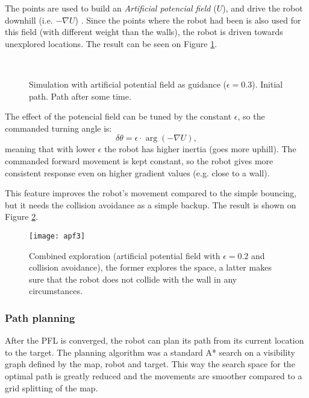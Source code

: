 		The points are used to build an \textit{Artificial potencial field} ($U$), and drive the robot downhill (i.e. $-\nabla U$) \parencite{choset_principles_2005}. Since the points where the robot had been is also used for this field (with different weight than the walls), the robot is driven towards unexplored locations. The result can be seen on Figure \ref{fig:apf}.
		
		\begin{figure}[h]
		    \centering
		    ~
		     
		    \caption{Simulation with artificial potential field as guidance ($\epsilon=0.3$). \protect{} Initial path. \protect{} Path after some time.}
		    \label{fig:apf}
	 	\end{figure}
	 	
	 	The effect of the potencial field can be tuned by the constant $\epsilon$, so the commanded turning angle is:
	 	\begin{equation}
			\delta \theta=\epsilon\cdot\arg(-\nabla U),
	 	\end{equation}
	 	meaning that with lower $\epsilon$ the robot has higher inertia (goes more uphill). The commanded forward movement is kept constant, so the robot gives more consistent response even on higher gradient values (e.g. close to a wall).
	 	
	 	
	 	This feature improves the robot's movement compared to the simple bouncing, but it needs the collision avoidance as a simple backup. The result is shown on Figure \ref{fig:apf3}.

		
		\begin{figure}[h]
			\centering
			\texttt{[image: apf3]}
			
			\caption{Combined exploration (artificial potential field with $\epsilon=0.2$ and collision avoidance), the former explores the space, a latter makes sure that the robot does not collide with the wall in any circumstances.}
			\label{fig:apf3}
	 	\end{figure}
	 	
	\subsubsection{Path planning} 	
	
		After the PFL is converged, the robot can plan its path from its current location to the target. The planning algorithm was a standard A* search \parencite{introduction_astar} on a visibility graph \parencite{choset_principles_2005} defined by the map, robot and target. This way the search space for the optimal path is greatly reduced and the movements are smoother compared to a grid splitting of the map.
	 	
		\FloatBarrier